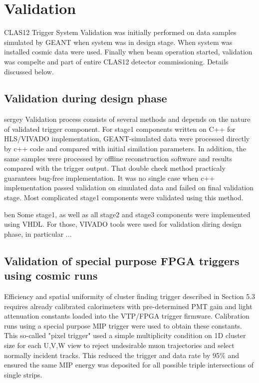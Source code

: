 \section{Validation}

CLAS12 Trigger System Validation was initially performed on data samples simulated by GEANT when system was in design stage. When system was installed cosmic data were used. Finally when beam operation started, validation was compelte and part of entire CLAS12 detector commissioning. Details discussed below.

\subsection{Validation during design phase}

sergey
Validation process consists of several methods and depends on the nature of validated trigger component. For stage1 components written on C++ for HLS/VIVADO implementation,
GEANT-simulated data were processed directly by c++ code and compared with initial similation parameters. 
In addition, the same samples were processed by offline reconstruction software and results compared with the trigger output. 
That double check method practicaly guarantees bug-free implementation. It was no single case when c++ implementation passed validation on
simulated data and failed on final validation stage. Most complicated stage1 components were validated using this method.

ben
Some stage1, as well as all stage2 and stage3 components were implemented using VHDL. For those, VIVADO tools were used for validation diring design phase, in particular ...

\subsection{Validation of special purpose FPGA triggers using cosmic runs} 

Efficiency and spatial uniformity of cluster finding trigger described in Section 5.3 requires already calibrated calorimeters with pre-determined PMT gain and light attenuation constants loaded into the VTP/FPGA trigger firmware.  Calibration runs using a special purpose MIP trigger were used to obtain these constants.  This so-called "pixel trigger" used a simple multiplicity condition on 1D cluster size for each U,V,W view to reject undesirable muon trajectories and select normally incident tracks.  This reduced the trigger and data rate by 95$\%$ and ensured the same MIP energy was deposited for all possible triple intersections of single strips.  

